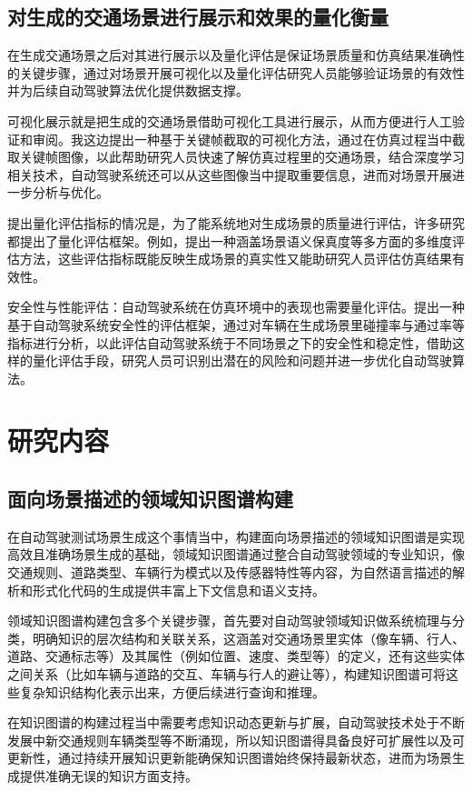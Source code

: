 \subsection{对生成的交通场景进行展示和效果的量化衡量}
在生成交通场景之后对其进行展示以及量化评估是保证场景质量和仿真结果准确性的关键步骤，通过对场景开展可视化以及量化评估研究人员能够验证场景的有效性并为后续自动驾驶算法优化提供数据支撑。

可视化展示就是把生成的交通场景借助可视化工具进行展示，从而方便进行人工验证和审阅。我这边提出一种基于关键帧截取的可视化方法，通过在仿真过程当中截取关键帧图像，以此帮助研究人员快速了解仿真过程里的交通场景，结合深度学习相关技术，自动驾驶系统还可以从这些图像当中提取重要信息，进而对场景开展进一步分析与优化。

提出量化评估指标的情况是，为了能系统地对生成场景的质量进行评估，许多研究都提出了量化评估框架。例如，提出一种涵盖场景语义保真度等多方面的多维度评估方法，这些评估指标既能反映生成场景的真实性又能助研究人员评估仿真结果有效性。

安全性与性能评估：自动驾驶系统在仿真环境中的表现也需要量化评估。提出一种基于自动驾驶系统安全性的评估框架，通过对车辆在生成场景里碰撞率与通过率等指标进行分析，以此评估自动驾驶系统于不同场景之下的安全性和稳定性，借助这样的量化评估手段，研究人员可识别出潜在的风险和问题并进一步优化自动驾驶算法。

\section{研究内容}
\subsection{面向场景描述的领域知识图谱构建}
在自动驾驶测试场景生成这个事情当中，构建面向场景描述的领域知识图谱是实现高效且准确场景生成的基础，领域知识图谱通过整合自动驾驶领域的专业知识\cite{Wang2021advSim}，像交通规则、道路类型、车辆行为模式以及传感器特性等内容，为自然语言描述的解析和形式化代码的生成提供丰富上下文信息和语义支持。

领域知识图谱构建包含多个关键步骤\cite{Xu2022Safebench}，首先要对自动驾驶领域知识做系统梳理与分类，明确知识的层次结构和关联关系，这涵盖对交通场景里实体（像车辆、行人、道路、交通标志等）及其属性（例如位置、速度、类型等）的定义，还有这些实体之间关系（比如车辆与道路的交互、车辆与行人的避让等），构建知识图谱可将这些复杂知识结构化表示出来，方便后续进行查询和推理。

在知识图谱的构建过程当中需要考虑知识动态更新与扩展\cite{Yang2020SurfelGAN}，自动驾驶技术处于不断发展中新交通规则车辆类型等不断涌现，所以知识图谱得具备良好可扩展性以及可更新性，通过持续开展知识更新能确保知识图谱始终保持最新状态，进而为场景生成提供准确无误的知识方面支持。

